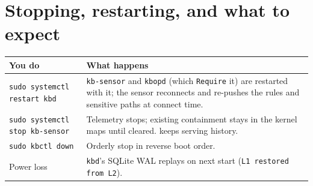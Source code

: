 \section{Stopping, restarting, and what to expect}
\begin{center}\small
\begin{tabularx}{\textwidth}{@{}L{4.2cm}Y@{}}
\toprule
\textbf{You do} & \textbf{What happens}\\
\midrule
\texttt{sudo systemctl restart kbd} & \texttt{kb-sensor} and \texttt{kbopd} (which \texttt{Require} it) are restarted with it; the sensor reconnects and  re-pushes the rules and sensitive paths at connect time.\\
\texttt{sudo systemctl stop kb-sensor} & Telemetry stops; existing containment stays in the kernel maps until cleared.  keeps serving history.\\
\texttt{sudo kbctl down} & Orderly stop in reverse boot order.\\
Power loss & \texttt{kbd}'s SQLite WAL replays on next start (\texttt{L1 restored from L2}).\\
\bottomrule
\end{tabularx}
\end{center}
